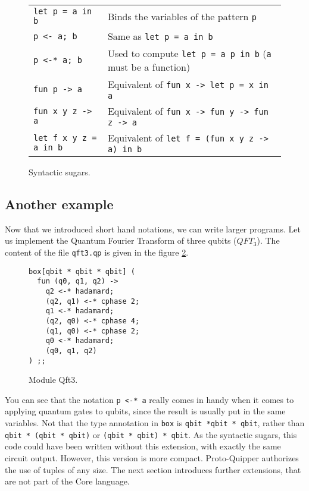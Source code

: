 \begin{figure}[!ht]
\begin{tabular}{ll}
	\verb#let p = a in b# & Binds the variables of the pattern \verb#p# \\
	\verb#p <- a; b#      & Same as \verb#let p = a in b# \\
	\verb#p <-* a; b#     & Used to compute \verb#let p = a p in b# (\verb#a# must be a function)\\
	\verb#fun p -> a#     & Equivalent of \verb#fun x -> let p = x in a# \\
	\verb#fun x y z -> a# & Equivalent of \verb#fun x -> fun y -> fun z -> a# \\
	\verb#let f x y z = a in b# & Equivalent of \verb#let f = (fun x y z -> a) in b#
\end{tabular}
\label{sugar}
\caption{Syntactic sugars.}
\end{figure}

\subsection{Another example}

Now that we introduced short hand notations, we can write larger programs. Let us implement the Quantum Fourier Transform 
of three qubits ($QFT_3$). The content of the file \verb#qft3.qp# is given in the figure \ref{qft3}.

\begin{figure}[!ht]
\begin{verbatim}
box[qbit * qbit * qbit] (
  fun (q0, q1, q2) ->
    q2 <-* hadamard;
    (q2, q1) <-* cphase 2;
    q1 <-* hadamard;
    (q2, q0) <-* cphase 4;
    (q1, q0) <-* cphase 2;
    q0 <-* hadamard;
    (q0, q1, q2)
) ;;
\end{verbatim}
\label{qft3}
\caption{Module Qft3.}
\end{figure}

You can see that the notation \verb#p <-* a# really comes in handy when it comes to applying quantum gates to
qubits, since the result is usually put in the same variables. Not that the type annotation in \verb#box# is
\verb#qbit *qbit * qbit#, rather than \verb#qbit * (qbit * qbit)# or \verb#(qbit * qbit) * qbit#. As the syntactic sugars,
this code could have been written without this extension, with exactly the same circuit output. However, this version is more compact.
Proto-Quipper authorizes the use of tuples of any size.
The next section introduces further extensions, that are not part of the Core language.

